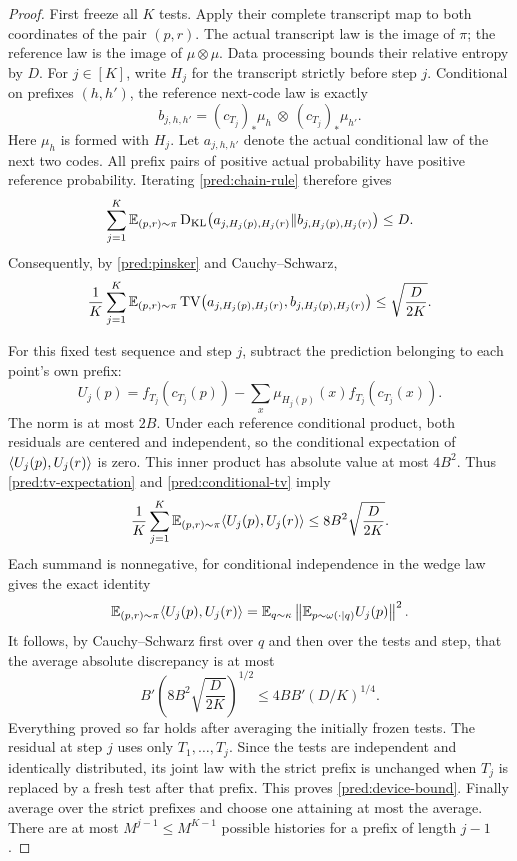 \begin{proof}
First freeze all \(K\) tests.  Apply their complete transcript map to both
coordinates of the pair \((p,r)\).  The actual transcript law is the image of
\(\pi\); the reference law is the image of \(\mu\otimes\mu\).
Data processing bounds their relative entropy by \(D\).
For \(j\in[K]\), write \(H_j\) for the transcript strictly before step \(j\).
Conditional on prefixes \((h,h')\), the reference next-code law is exactly
\[
 b_{j,h,h'}=
 (c_{T_j})_*\mu_h\ \otimes\ (c_{T_j})_*\mu_{h'}.
\]
Here \(\mu_h\) is formed with \(H_j\).  Let \(a_{j,h,h'}\) denote the actual
conditional law of the next two codes.  All prefix pairs of positive actual
probability have positive reference probability.  Iterating
\eqref{pred:chain-rule} therefore gives
\begin{equation}\label{pred:conditional-kl}
 \sum_{j=1}^K
 \mathbb E_{(p,r)\sim\pi}
 \operatorname{D_{\mathrm{KL}}}\bigl(a_{j,H_j(p),H_j(r)}\Vert
          b_{j,H_j(p),H_j(r)}\bigr)\le D.
\end{equation}
Consequently, by \eqref{pred:pinsker} and Cauchy--Schwarz,
\begin{equation}\label{pred:conditional-tv}
 \frac1K\sum_{j=1}^K
 \mathbb E_{(p,r)\sim\pi}
 \operatorname{TV}\bigl(a_{j,H_j(p),H_j(r)},b_{j,H_j(p),H_j(r)}\bigr)
 \le\sqrt{\frac{D}{2K}}.
\end{equation}

For this fixed test sequence and step \(j\), subtract the prediction belonging
to each point's own prefix:
\[
 U_j(p)=f_{T_j}(c_{T_j}(p))-
            \sum_x\mu_{H_j(p)}(x)f_{T_j}(c_{T_j}(x)).
\]
The norm is at most \(2B\).  Under each reference conditional product, both
residuals are centered and independent, so the conditional expectation of
\(\langle U_j(p),U_j(r)\rangle\) is zero.  This inner product has absolute value at
most \(4B^2\).  Thus \eqref{pred:tv-expectation} and
\eqref{pred:conditional-tv} imply
\begin{equation}\label{pred:residual-variance}
 \frac1K\sum_{j=1}^K
 \mathbb E_{(p,r)\sim\pi}\langle U_j(p),U_j(r)\rangle
 \le8B^2\sqrt{\frac{D}{2K}}.
\end{equation}
Each summand is nonnegative, for conditional independence in the wedge law
gives the exact identity
\begin{equation}\label{pred:wedge-square}
 \mathbb E_{(p,r)\sim\pi}\langle U_j(p),U_j(r)\rangle
 =\mathbb E_{q\sim\kappa}
       \left\|\mathbb E_{p\sim\omega(\cdot\mid q)}U_j(p)\right\|^2.
\end{equation}
It follows, by Cauchy--Schwarz first over \(q\) and then over the tests and
step, that the average absolute discrepancy is at most
\[
 B'\left(8B^2\sqrt{\frac{D}{2K}}\right)^{1/2}
 \le4BB'(D/K)^{1/4}.
\]
Everything proved so far holds after averaging the initially frozen tests.
The residual at step \(j\) uses only \(T_1,\ldots,T_j\).  Since the tests
are independent and identically distributed, its joint law with the strict
prefix is unchanged when \(T_j\) is replaced by a fresh test after that
prefix.  This proves \eqref{pred:device-bound}.  Finally average over the
strict prefixes and choose one attaining at most the average.  There are at
most \(M^{j-1}\le M^{K-1}\) possible histories for a prefix of length \(j-1\).
\end{proof}

